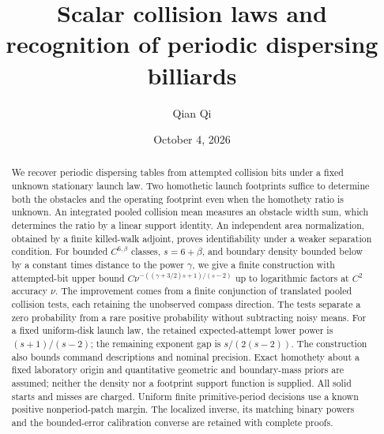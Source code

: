 \documentclass[11pt]{amsart}
\title[Scalar collision laws]{Scalar collision laws and recognition of periodic dispersing billiards}
\author{Qian Qi}
\date{October 4, 2026}
\theoremstyle{definition}\newtheorem{definition}[theorem]{Definition}
\theoremstyle{remark}\newtheorem{remark}[theorem]{Remark}
\numberwithin{equation}{section}
\begin{document}
\raggedbottom
\begin{abstract}
We recover periodic dispersing tables from attempted collision bits
under a fixed unknown stationary launch law. Two homothetic launch
footprints suffice to determine both the obstacles and the operating
footprint even when the homothety ratio is unknown. An integrated pooled collision mean measures an obstacle width sum,
which determines the ratio by a linear support identity. An independent
area normalization, obtained by a finite killed-walk adjoint, proves
identifiability under a weaker separation condition.
For bounded $C^{6,\beta}$ classes, $s=6+\beta$, and boundary density
bounded below by a constant times distance to the power $\gamma$, we
give a finite construction with attempted-bit upper bound
$C\nu^{-((\gamma+3/2)s+1)/(s-2)}$
up to logarithmic factors at $C^2$ accuracy $\nu$.
The improvement comes from a finite conjunction of translated pooled
collision tests, each retaining the unobserved compass direction.
The tests separate a zero probability from a rare positive probability
without subtracting noisy means. For a fixed uniform-disk launch law,
the retained expected-attempt lower power is $(s+1)/(s-2)$; the
remaining exponent gap is $s/(2(s-2))$.
The construction also bounds command descriptions and nominal precision.
Exact homothety about a fixed laboratory origin and quantitative
geometric and boundary-mass priors are assumed; neither the density nor
a footprint support function is supplied. All solid starts and misses
are charged. Uniform finite primitive-period decisions use a known
positive nonperiod-patch margin. The localized inverse, its matching
binary powers and the bounded-error calibration converse are retained
with complete proofs.
\end{abstract}
\maketitle








\appendix











\end{document}
